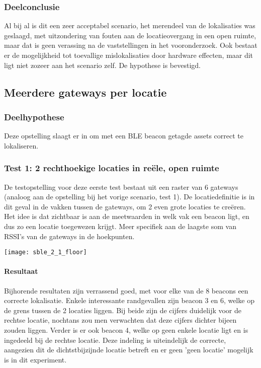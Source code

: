 \subsubsection{Deelconclusie}
Al bij al is dit een zeer acceptabel scenario, het merendeel van de lokalisaties was geslaagd, met uitzondering van fouten aan de locatieovergang in een open ruimte, maar dat is geen verassing na de vaststellingen in het vooronderzoek. Ook bestaat er de mogelijkheid tot toevallige mislokalisaties door hardware effecten, maar dit ligt niet zozeer aan het scenario zelf. De hypothese is bevestigd.

\subsection{Meerdere gateways per locatie}
\subsubsection{Deelhypothese}
Deze opstelling slaagt er in om met een BLE beacon getagde assets correct te lokaliseren.

\subsubsection{Test 1: 2 rechthoekige locaties in reële, open ruimte}
\begin{minipage}{0.55\textwidth}
De testopstelling voor deze eerste test bestaat uit een raster van 6 gateways (analoog aan de opstelling bij het vorige scenario, test 1). De locatiedefinitie is in dit geval in de vakken tussen de gateways, om 2 even grote locaties te creëren. Het idee is dat zichtbaar is aan de meetwaarden in welk vak een beacon ligt, en dus zo een locatie toegewezen krijgt. Meer specifiek aan de laagste som van RSSI's van de gateways in de hoekpunten. 
\end{minipage}
\hfill
\begin{minipage}{0.42\textwidth}
	\texttt{[image: sble\_2\_1\_floor]}
\end{minipage}

\paragraph{Resultaat}
Bijhorende resultaten zijn verrassend goed, met voor elke van de 8 beacons een correcte lokalisatie. Enkele interessante randgevallen zijn beacon 3 en 6, welke op de grens tussen de 2 locaties liggen. Bij beide zijn de cijfers duidelijk voor de rechtse locatie, nochtans zou men verwachten dat deze cijfers dichter bijeen zouden liggen. Verder is er ook beacon 4, welke op geen enkele locatie ligt en is ingedeeld bij de rechtse locatie. Deze indeling is uiteindelijk de correcte, aangezien dit de dichtstbijzijnde locatie betreft en er geen 'geen locatie' mogelijk is in dit experiment. 

